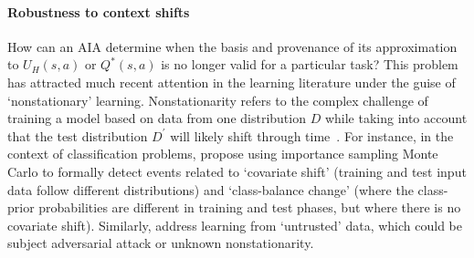 %

\paragraph{Robustness to context shifts}
How can an AIA determine when the basis and provenance of its approximation to $U_H(s,a)$ or $Q^*(s,a)$ is no longer valid for a particular task? 
This problem has attracted much recent attention in the learning literature under the guise of `nonstationary' learning. 
Nonstationarity refers to the complex challenge of training a model based on data from one distribution $D$ while taking into account that the test distribution $D^\prime$ will likely shift through time~\cite{Quinonero-Candela2009-fj}. 
For instance, in the context of classification problems, \citet{Sugiyama2013-ci} propose using importance sampling Monte Carlo to formally detect events related to `covariate shift' (training and test input data follow different distributions) and `class-balance change' (where the class-prior probabilities are different in training and test phases, but where there is no covariate shift). 
Similarly, \citet{Charikar2017-kr} address learning from `untrusted' data, which could be subject adversarial attack or unknown nonstationarity. 

